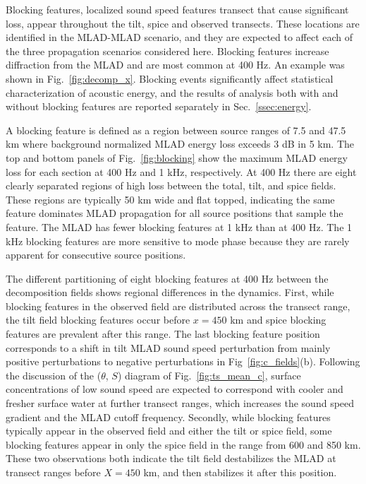 \documentclass[preprint,NumberedRefs]{JASA}
\begin{document}
Blocking features, localized sound speed features transect that cause significant loss, appear throughout the tilt, spice and observed transects. These locations are identified in the MLAD-MLAD scenario, and they are expected to affect each of the three propagation scenarios considered here. Blocking features increase diffraction from the MLAD and are most common at 400 Hz. An example was shown in Fig.~\ref{fig:decomp_x}. Blocking events significantly affect statistical characterization of acoustic energy, and the results of analysis both with and without blocking features are reported separately in Sec.~\ref{ssec:energy}.

A blocking feature is defined as a region between source ranges of 7.5 and 47.5 km where background normalized MLAD energy loss exceeds 3 dB in 5 km. The top and bottom panels of Fig.~\ref{fig:blocking} show the maximum MLAD energy loss for each section at 400 Hz and 1 kHz, respectively. At 400 Hz there are eight clearly separated regions of high loss between the total, tilt, and spice fields. These regions are typically 50 km wide and flat topped, indicating the same feature dominates MLAD propagation for all source positions that sample the feature. The MLAD has fewer blocking features at 1 kHz than at 400 Hz. The 1 kHz blocking features are more sensitive to mode phase because they are rarely apparent for consecutive source positions.

The different partitioning of eight blocking features at 400 Hz between the decomposition fields shows regional differences in the dynamics. First, while blocking features in the observed field are distributed across the transect range, the tilt field blocking features occur before $x=450$ km and spice blocking features are prevalent after this range. The last blocking feature position corresponds to a shift in tilt MLAD sound speed perturbation from mainly positive perturbations to negative perturbations in Fig~\ref{fig:c_fields}(b). Following the discussion of the ($\theta$, $S$) diagram of Fig.~\ref{fig:ts_mean_c}, surface concentrations of low sound speed are expected to correspond with cooler and fresher surface water at further transect ranges, which increases the sound speed gradient and the MLAD cutoff frequency. Secondly, while blocking features typically appear in the observed field and either the tilt or spice field, some blocking features appear in only the spice field in the range from 600 and 850 km. These two observations both indicate the tilt field destabilizes the MLAD at transect ranges before $X=450$ km, and then stabilizes it after this position.
\end{document}
